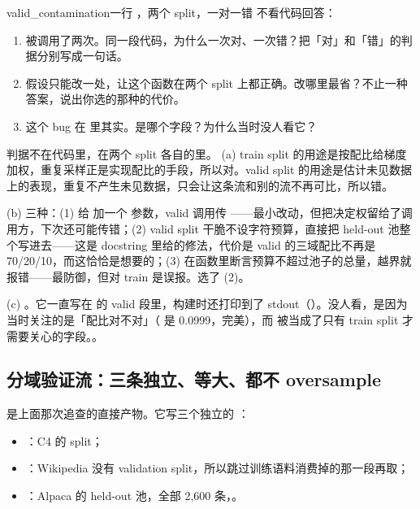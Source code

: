 \begin{checkpoint}{valid_contamination}{一行 ，两个 split，一对一错}
不看代码回答：
\begin{enumerate}[label=(\alph*)]
  \item {} 被调用了两次。同一段代码，为什么一次对、一次错？把「对」和「错」的判据分别写成一句话。
  \item 假设只能改一处，让这个函数在两个 split 上都正确。改哪里最省？不止一种答案，说出你选的那种的代价。
  \item 这个 bug 在  里其实。是哪个字段？为什么当时没人看它？
\end{enumerate}
\hint 判据不在代码里，在两个 split 各自的里。
\ifshowanswers
\tcblower
\answer (a) train split 的用途是按配比给梯度加权，重复采样正是实现配比的手段，所以对。valid split 的用途是估计未见数据上的表现，重复不产生未见数据，只会让这条流和别的流不再可比，所以错。

(b) 三种：(1) 给  加一个  参数，valid 调用传 ——最小改动，但把决定权留给了调用方，下次还可能传错；(2) valid split 干脆不设字符预算，直接把 held-out 池整个写进去——这是 docstring 里给的修法，代价是 valid 的三域配比不再是 70/20/10，而这恰恰是想要的；(3) 在函数里断言预算不超过池子的总量，越界就报错——最防御，但对 train 是误报。选了 (2)。

(c) 。它一直写在  的 valid 段里，构建时还打印到了 stdout（）。没人看，是因为当时关注的是「配比对不对」（ 是 0.0999，完美），而  被当成了只有 train split 才需要关心的字段。。
\whereincode {}
\fi
\end{checkpoint}

\subsection{分域验证流：三条独立、等大、都不 oversample}
\label{subsec:domain-valid}

 是上面那次追查的直接产物。它写三个独立的 ：

\begin{itemize}\itemsep2pt
  \item {}：C4 的  split；
  \item {}：Wikipedia 没有 validation split，所以跳过训练语料消费掉的那一段再取；
  \item {}：Alpaca 的 held-out 池，全部 2{,}600 条，。
\end{itemize}

